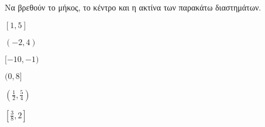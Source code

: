 Να βρεθούν το μήκος, το κέντρο και η ακτίνα των παρακάτω διαστημάτων.
\begin{multicols}{2}
\begin{alist}
\item $ [1,5] $
\item $ (-2,4) $
\item $ [-10,-1) $
\item $ (0,8] $
\item $ \left(\frac{1}{2},\frac{5}{4}\right) $
\item $ \left[\frac{3}{8},2\right] $
\end{alist}
\end{multicols}
